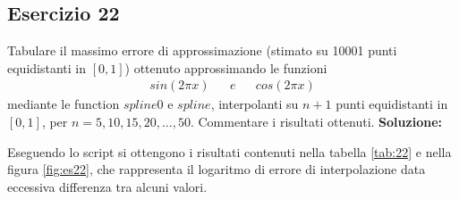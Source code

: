 \subsection{Esercizio 22}
Tabulare il massimo errore di approssimazione (stimato su 10001 punti equidistanti
in $[0, 1]$) ottenuto approssimando le funzioni
\[
    \begin{array}{ccccc}
        sin(2\pi x) &  & e &  & cos(2\pi x)
    \end{array}
\]
mediante le function $spline0$ e $spline$, interpolanti su $n + 1$ punti equidistanti in $[0, 1]$,
per $n = 5, 10, 15, 20, \dots, 50$. Commentare i risultati ottenuti.
\newline \textbf{Soluzione:}

Eseguendo lo script  si ottengono i risultati contenuti nella tabella \ref{tab:22}
e nella figura \ref{fig:es22}, che rappresenta il logaritmo di errore di interpolazione data
eccessiva differenza tra alcuni valori.
